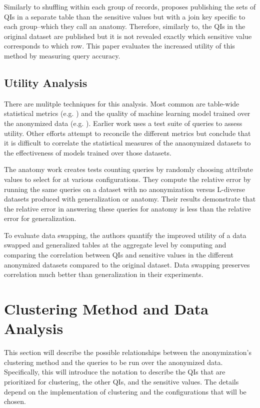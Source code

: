 Similarly to shuffling within each group of records, \cite{xiaoAnatomy} proposes publishing the sets of QIs in a separate table than the sensitive values but with a join key specific to each group--which they call an anatomy. Therefore, similarly to\cite{soriaSwapping}, the QIs in the original dataset are published but it is not revealed exactly which sensitive value corresponds to which row. This paper evaluates the increased utility of this method by measuring query accuracy.

\subsection{Utility Analysis}
There are mulitple techniques for this analysis. Most common are table-wide statistical metrics (e.g. \cite{soriaSwapping}) and the quality of machine learning model trained over the anonymized data (e.g. \cite{sangogboyePad}). Earlier work\cite{xiaoAnatomy} uses a test suite of queries to assess utility. Other efforts attempt to reconcile the different metrics but conclude that it is difficult to correlate the statistical measures of the anaonymized datasets to the effectiveness of models trained over those datasets\cite{vsarvcevicEffectiveness}.

The anatomy work\cite{xiaoAnatomy} creates tests counting queries by randomly choosing attribute values to select for at various configurations. They compute the relative error by running the same queries on a dataset with no anonymization versus L-diverse datasets produced with generalization or anatomy. Their results demonstrate that the relative error in answering these queries for anatomy is less than the relative error for generalization.

To evaluate data swapping\cite{soriaSwapping}, the authors quantify the improved utility of a data swapped and generalized tables at the aggregate level by computing and comparing the correlation between QIs and sensitive values in the different anonymized datasets compared to the original dataset. Data swapping preserves correlation much better than generalization in their experiments.

\section{Clustering Method and Data Analysis}
This section will describe the possible relationships between the anonymization’s clustering method and the queries to be run over the anonymized data. Specifically, this will introduce the notation to describe the QIs that are prioritized for clustering, the other QIs, and the sensitive values. The details depend on the implementation of clustering and the configurations that will be chosen.

